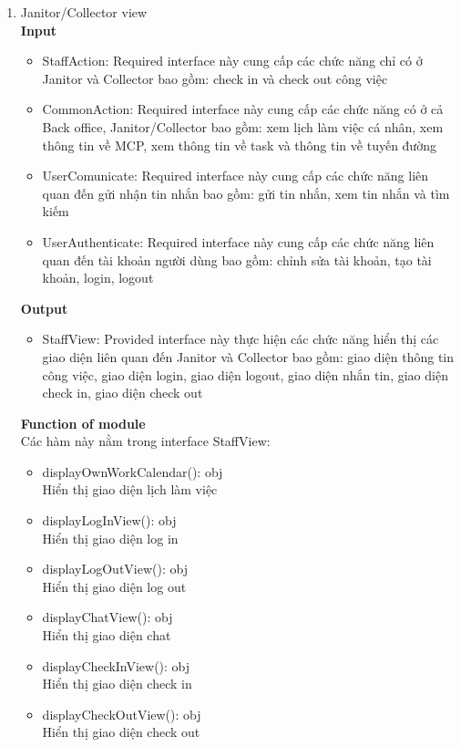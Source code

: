 \documentclass[a4paper]{article}
\begin{document}
\begin{enumerate}
          \item Janitor/Collector view \\
 \textbf{Input}
 \begin{itemize}
     \item StaffAction: Required interface này cung cấp các chức năng chỉ có ở Janitor và Collector bao gồm: check in và check out công việc
     \item CommonAction: Required interface này cung cấp các chức năng có ở cả Back office, Janitor/Collector bao gồm: xem lịch làm việc cá nhân, xem thông tin về MCP, xem thông tin về task và thông tin về tuyến đường
     \item UserComunicate: Required interface này cung cấp các chức năng liên quan đến gửi nhận tin nhắn bao gồm: gửi tin nhắn, xem tin nhắn và tìm kiếm
     \item UserAuthenticate:  Required interface này cung cấp các chức năng liên quan đến tài khoản người dùng bao gồm: chỉnh sửa tài khoản, tạo tài khoản, login, logout
 \end{itemize}
  \textbf{Output}
   \begin{itemize}
     \item StaffView: Provided interface này thực hiện các chức năng hiển thị các giao diện liên quan đến Janitor và Collector bao gồm: giao diện  thông tin công việc, giao diện login, giao diện logout, giao diện nhắn tin, giao diện check in, giao diện check out
 \end{itemize}
  \textbf{Function of module}\\
  Các hàm này nằm trong interface StaffView:
     \begin{itemize}
     \item  displayOwnWorkCalendar(): obj\\
     Hiển thị giao diện lịch làm việc
\item  displayLogInView(): obj \\
Hiển thị giao diện log in
\item  displayLogOutView(): obj \\
Hiển thị giao diện log out
\item  displayChatView(): obj \\
Hiển thị giao diện chat
\item  displayCheckInView(): obj \\
Hiển thị giao diện check in
\item  displayCheckOutView(): obj \\
Hiển thị giao diện check out
 \end{itemize}
 

\end{enumerate}
\end{document}
